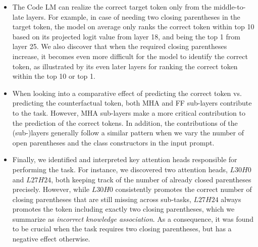 \begin{itemize}
    \item The Code LM can realize the correct target token only from the middle-to-late layers. For example, in case of needing two closing parentheses in the target token, the model on average only ranks the correct token within top 10 based on its projected logit value from layer 18, and being the top 1 from layer 25. We also discover that when the required closing parentheses increase, it becomes even more difficult for the model to identify the correct token, as illustrated by its even later layers for ranking the correct token within the top 10 or top 1.
    \item When looking into a comparative effect of predicting the correct token vs. predicting the counterfactual token, both MHA and FF sub-layers contribute to the task. However, MHA sub-layers make a more critical contribution to the prediction of the correct tokens. In addition, the contributions of the (sub-)layers generally follow a similar pattern when we vary the number of open parentheses and the class constructors in the input prompt.
    \item Finally, we identified and interpreted key attention heads responsible for performing the task. For instance, we discovered two attention heads, $L30H0$ and $L27H24$, both keeping track of the number of already closed parentheses precisely.
    However, while $L30H0$ consistently promotes the correct number of closing parentheses that are still missing across sub-tasks, $L27H24$ always promotes the token including exactly two closing parentheses, which we summarize as \emph{incorrect knowledge association}. As a consequence, it was found to be crucial when the task requires two closing parentheses, but has a negative effect otherwise.
\end{itemize}


 

